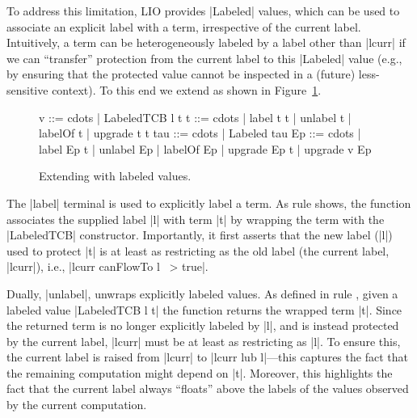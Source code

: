 To address this limitation, LIO provides |Labeled| values, which
can be used to associate an explicit label
with a term, irrespective of the current label.
%
Intuitively, a term can be heterogeneously labeled by a label other
than |lcurr| if we can ``transfer'' protection from the current label
to this |Labeled| value (e.g., by ensuring that the protected value
cannot be inspected in a (future) less-sensitive context).
%
To this end we extend \lio{} as shown in Figure~\ref{fig:sos:labeled}.
\begin{figure}[ht] %
\small
\begin{code}
v    ::= cdots  | LabeledTCB l t
t    ::= cdots  | label t t | unlabel t | labelOf t | upgrade t t
tau  ::= cdots  | Labeled tau
Ep   ::= cdots  | label Ep t | unlabel Ep | labelOf Ep
                | upgrade Ep t | upgrade v Ep
\end{code}

\caption{Extending \lio{} with labeled values\label{fig:sos:labeled}.}
\end{figure}

The |label| terminal is used to explicitly label a term.
%
As rule  shows, the function associates the supplied
label |l| with term |t| by wrapping the term with the |LabeledTCB|
constructor.
%
Importantly, it first asserts that the new label (|l|) used to
protect |t| is at least as restricting as the old label (the current
label, |lcurr|), i.e., |lcurr canFlowTo l ~> true|.
 
Dually, |unlabel|, unwraps explicitly labeled values.
%
As defined in rule , given a labeled value
|LabeledTCB l t| the function returns the wrapped term |t|.
%
Since the returned term is no longer explicitly labeled by |l|, and
is instead protected by the current label, |lcurr| must be at least
as restricting as |l|.
%
To ensure this, the current label is raised from |lcurr| to |lcurr lub
l|---this captures the fact that the remaining computation might
depend on |t|. 
%
Moreover, this highlights the fact that the current label always
``floats'' above the labels of the values observed by the current
computation.


